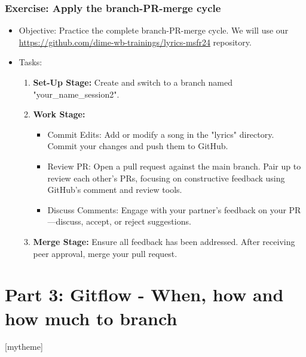 \documentclass[aspectratio=169]{beamer}
\newcommand{\sectionpic}[2]{
	\section{#1}
	\setbeamertemplate{section page}[mytheme]
}
\newcommand{\exerciseURL}[1]{{\color{blue}\url{#1}}}
\newcommand{\exerciseRepoURL}{\href{https://github.com/dime-wb-trainings/lyrics-msfr24}{\exerciseURL{https://github.com/dime-wb-trainings/lyrics-msfr24}}}
\newcommand{\rootdir}{../../../}
\begin{document}
\begin{frame}
	\frametitle{Exercise: Apply the branch-PR-merge cycle}
		\begin{itemize}
		\item Objective: Practice the complete branch-PR-merge cycle.  We will use our \exerciseRepoURL{} repository.
		\item Tasks:
		\begin{enumerate}
			\item \textbf{Set-Up Stage:} Create and switch to a branch named "your\_name\_session2".
			\item \textbf{Work Stage:}
			\begin{itemize}
				\item Commit Edits: Add or modify a song in the "lyrics" directory. Commit your changes and push them to GitHub.
				\item Review PR: Open a pull request against the main branch. Pair up to review each other’s PRs, focusing on constructive feedback using GitHub’s comment and review tools.
				\item Discuss Comments: Engage with your partner's feedback on your PR—discuss, accept, or reject suggestions.
			\end{itemize}
			\item \textbf{Merge Stage:} Ensure all feedback has been addressed. After receiving peer approval, merge your pull request.
		\end{enumerate}
	\end{itemize}
\end{frame}


\sectionpic{Part 3: \newline Gitflow - When, how and how much to branch}{\rootdir common-resources/img/section-slide-2023}
\end{document}
